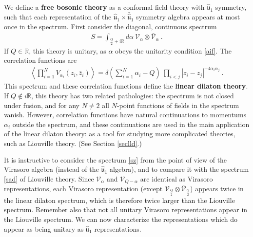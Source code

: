 \documentclass[12pt,a4paper,notitlepage]{report}
\numberwithin{equation}{section}
\theoremstyle{break}
\begin{document}
We define a \textbf{\boldmath free bosonic theory} as a conformal field theory with $\hat{\mathfrak{u}}_1$ symmetry, such that each representation of the $\hat{\mathfrak{u}}_1 \times \bar{\hat{\mathfrak{u}}}_1$ symmetry algebra appears at most once in the spectrum.
First consider the diagonal, continuous spectrum 
\begin{align}
 \boxed{S = \int_{\frac{Q}{2}+i{\mathbb{R}}} d\alpha \ \mathcal{V}_\alpha \otimes \bar{\mathcal{V}}_\alpha}\ .
\label{sz}
\end{align}
If $Q\in {\mathbb{R}}$, this theory is unitary, as $\alpha$ obeys the unitarity condition \eqref{aif}.
The correlation functions are 
\begin{align}
 \left\langle \prod_{i=1}^N V_{\alpha_i}(z_i,\bar{z}_i)\right\rangle = \delta\left({\textstyle \sum}_{i=1}^N\alpha_i-Q\right)\ \prod_{i<j} |z_i-z_j|^{-4\alpha_i\alpha_j} \ .
\label{dpzz}
\end{align}
This spectrum and these correlation functions define the \textbf{\boldmath linear dilaton theory}. 
If $Q\notin i{\mathbb{R}}$, this theory has two related pathologies: the spectrum is not closed under fusion, and for any $N\neq 2$ all $N$-point functions of fields in the spectrum vanish.
However, correlation functions have natural continuations to momentums $\alpha_i$ outside the spectrum, and these continuations are used in the main application of the linear dilaton theory: 
as a tool for studying more complicated theories, such as Liouville theory. (See Section \ref{seclld}.) 

It is instructive to consider the spectrum \eqref{sz} from the point of view of the Virasoro algebra (instead of the $\hat{\mathfrak{u}}_1$ algebra), and to compare it with the spectrum \eqref{sad} of Liouville theory.
Since $\mathcal{V}_\alpha$ and $\mathcal{V}_{Q-\alpha}$ are identical as Virasoro representations, each Virasoro representation (except $\mathcal{V}_{\frac{Q}{2}}\otimes \bar{\mathcal{V}}_{\frac{Q}{2}}$) appears twice in the linear dilaton spectrum, which is therefore twice larger than the Liouville spectrum.
Remember also that not all unitary Virasoro representations appear in the Liouville spectrum.
We can now characterize
the representations which do appear as being unitary as $\hat{\mathfrak{u}}_1$ representations.
\end{document}
